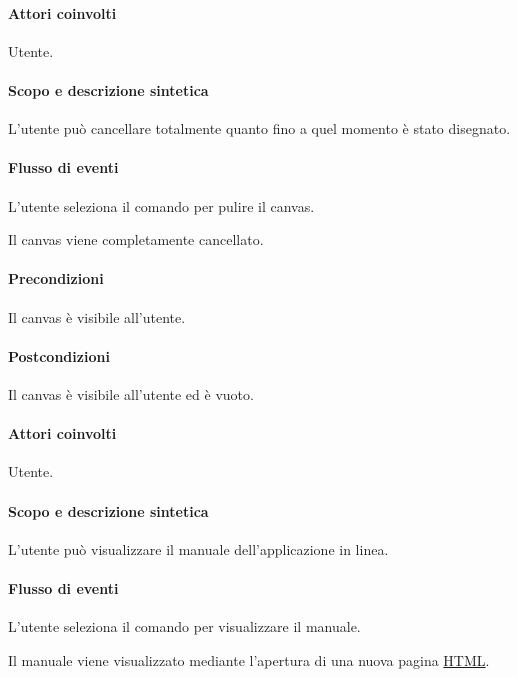 
\paragraph{Attori coinvolti} Utente.
\paragraph{Scopo e descrizione sintetica}
L'utente pu\`o cancellare totalmente quanto fino a quel momento \`e stato disegnato.
\paragraph{Flusso di eventi}
\begin{elenconumerato}[\textbf{}]{\subsubsecindent}
\item L'utente seleziona il comando per pulire il canvas. 
\item Il canvas viene completamente cancellato.
\end{elenconumerato}
\paragraph{Precondizioni} Il canvas \`e visibile all'utente.
\paragraph{Postcondizioni} Il canvas \`e visibile all'utente ed \`e vuoto.

\paragraph{Attori coinvolti} Utente.
\paragraph{Scopo e descrizione sintetica}
L'utente pu\`o visualizzare il manuale dell'applicazione in linea.
\paragraph{Flusso di eventi}
\begin{elenconumerato}[\textbf{}]{\subsubsecindent}
\item L'utente seleziona il comando per visualizzare il manuale. 
\item Il manuale viene visualizzato mediante l'apertura di una nuova pagina {\underline{HTML}}.
\end{elenconumerato}
